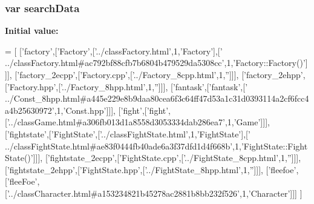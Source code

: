 \subsubsection[{search\-Data}]{\setlength{\rightskip}{0pt plus 5cm}var search\-Data}\label{all__6_8js_ad01a7523f103d6242ef9b0451861231e}
{\bfseries Initial value\-:}
\begin{DoxyCode}
=
[
  [\textcolor{stringliteral}{'factory'},[\textcolor{stringliteral}{'Factory'},[\textcolor{stringliteral}{'../classFactory.html'},1,\textcolor{stringliteral}{'Factory'}],[\textcolor{stringliteral}{'
      ../classFactory.html#ac792bf88cfb7b6804b479529da5308cc'},1,\textcolor{stringliteral}{'Factory::Factory()'}]]],
  [\textcolor{stringliteral}{'factory\_2ecpp'},[\textcolor{stringliteral}{'Factory.cpp'},[\textcolor{stringliteral}{'../Factory\_8cpp.html'},1,\textcolor{stringliteral}{''}]]],
  [\textcolor{stringliteral}{'factory\_2ehpp'},[\textcolor{stringliteral}{'Factory.hpp'},[\textcolor{stringliteral}{'../Factory\_8hpp.html'},1,\textcolor{stringliteral}{''}]]],
  [\textcolor{stringliteral}{'fantask'},[\textcolor{stringliteral}{'fantask'},[\textcolor{stringliteral}{'
      ../Const\_8hpp.html#a445e229e8b9daa80cea6f3c64ff47d53a1c31d0393114a2cf6fcc4a4b25630972'},1,\textcolor{stringliteral}{'Const.hpp'}]]],
  [\textcolor{stringliteral}{'fight'},[\textcolor{stringliteral}{'fight'},[\textcolor{stringliteral}{'../classGame.html#a306fb013d1a8558d3053334dab286ea7'},1,\textcolor{stringliteral}{'Game'}]]],
  [\textcolor{stringliteral}{'fightstate'},[\textcolor{stringliteral}{'FightState'},[\textcolor{stringliteral}{'../classFightState.html'},1,\textcolor{stringliteral}{'FightState'}],[\textcolor{stringliteral}{'
      ../classFightState.html#ae83f0444fb40ade6a3f37dfd1d4f668b'},1,\textcolor{stringliteral}{'FightState::FightState()'}]]],
  [\textcolor{stringliteral}{'fightstate\_2ecpp'},[\textcolor{stringliteral}{'FightState.cpp'},[\textcolor{stringliteral}{'../FightState\_8cpp.html'},1,\textcolor{stringliteral}{''}]]],
  [\textcolor{stringliteral}{'fightstate\_2ehpp'},[\textcolor{stringliteral}{'FightState.hpp'},[\textcolor{stringliteral}{'../FightState\_8hpp.html'},1,\textcolor{stringliteral}{''}]]],
  [\textcolor{stringliteral}{'fleefoe'},[\textcolor{stringliteral}{'fleeFoe'},[\textcolor{stringliteral}{'../classCharacter.html#a153234821b45278ac2881b8bb232f526'},1,\textcolor{stringliteral}{'Character'}]]]
]
\end{DoxyCode}
